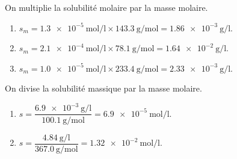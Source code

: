 \documentclass[11pt,a4paper]{article}
\begin{document}
\begin{corrige}[du molaire au massique : $s_m = s\times M$]
On multiplie la solubilité molaire par la masse molaire.
\begin{enumerate}[label=\alph*)]
  \item $s_m = \qty{1.3e-5}{\mole\per\litre}\times\qty{143.3}{\gram\per\mole}
             = \qty{1.86e-3}{\gram\per\litre}$.
  \item $s_m = \qty{2.1e-4}{\mole\per\litre}\times\qty{78.1}{\gram\per\mole}
             = \qty{1.64e-2}{\gram\per\litre}$.
  \item $s_m = \qty{1.0e-5}{\mole\per\litre}\times\qty{233.4}{\gram\per\mole}
             = \qty{2.33e-3}{\gram\per\litre}$.
\end{enumerate}
\end{corrige}

\begin{corrige}[du massique au molaire : $s = s_m/M$]
On divise la solubilité massique par la masse molaire.
\begin{enumerate}[label=\alph*)]
  \item $s = \dfrac{\qty{6.9e-3}{\gram\per\litre}}{\qty{100.1}{\gram\per\mole}}
           = \qty{6.9e-5}{\mole\per\litre}$.
  \item $s = \dfrac{\qty{4.84}{\gram\per\litre}}{\qty{367.0}{\gram\per\mole}}
           = \qty{1.32e-2}{\mole\per\litre}$.
\end{enumerate}
\end{corrige}
\end{document}
